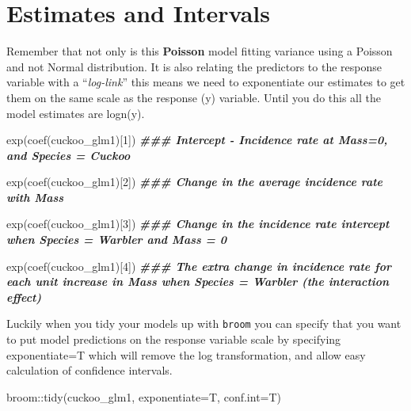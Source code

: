\documentclass[
]{book}
\newenvironment{Shaded}{\begin{snugshade}}{\end{snugshade}}
\newcommand{\AttributeTok}[1]{\textcolor[rgb]{0.77,0.63,0.00}{#1}}
\newcommand{\DecValTok}[1]{\textcolor[rgb]{0.00,0.00,0.81}{#1}}
\newcommand{\DocumentationTok}[1]{\textcolor[rgb]{0.56,0.35,0.01}{\textbf{\textit{#1}}}}
\newcommand{\FunctionTok}[1]{\textcolor[rgb]{0.00,0.00,0.00}{#1}}
\newcommand{\NormalTok}[1]{#1}
\newcommand{\SpecialCharTok}[1]{\textcolor[rgb]{0.00,0.00,0.00}{#1}}
\begin{document}
\hypertarget{estimates-and-intervals}{%
\section{Estimates and Intervals}\label{estimates-and-intervals}}

Remember that not only is this \textbf{Poisson} model fitting variance using a Poisson and not Normal distribution. It is also relating the predictors to the response variable with a ``\emph{log-link}'' this means we need to exponentiate our estimates to get them on the same scale as the response (y) variable. Until you do this all the model estimates are logn(y).

\begin{Shaded}
\begin{Highlighting}[]
\FunctionTok{exp}\NormalTok{(}\FunctionTok{coef}\NormalTok{(cuckoo\_glm1)[}\DecValTok{1}\NormalTok{]) }\DocumentationTok{\#\#\# Intercept {-} Incidence rate at Mass=0, and Species = Cuckoo}

\FunctionTok{exp}\NormalTok{(}\FunctionTok{coef}\NormalTok{(cuckoo\_glm1)[}\DecValTok{2}\NormalTok{]) }\DocumentationTok{\#\#\# Change in the average incidence rate with Mass }

\FunctionTok{exp}\NormalTok{(}\FunctionTok{coef}\NormalTok{(cuckoo\_glm1)[}\DecValTok{3}\NormalTok{]) }\DocumentationTok{\#\#\# Change in the incidence rate intercept when Species = Warbler and Mass = 0}
 
\FunctionTok{exp}\NormalTok{(}\FunctionTok{coef}\NormalTok{(cuckoo\_glm1)[}\DecValTok{4}\NormalTok{]) }\DocumentationTok{\#\#\# The extra change in incidence rate for each unit increase in Mass when Species = Warbler (the interaction effect)}
\end{Highlighting}
\end{Shaded}

Luckily when you tidy your models up with \texttt{broom} you can specify that you want to put model predictions on the response variable scale by specifying exponentiate=T which will remove the log transformation, and allow easy calculation of confidence intervals.

\begin{Shaded}
\begin{Highlighting}[]
\NormalTok{broom}\SpecialCharTok{::}\FunctionTok{tidy}\NormalTok{(cuckoo\_glm1, }
            \AttributeTok{exponentiate=}\NormalTok{T, }
            \AttributeTok{conf.int=}\NormalTok{T)}
\end{Highlighting}
\end{Shaded}
\end{document}
